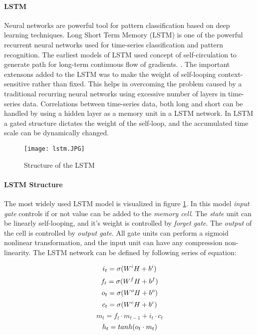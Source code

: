 \paragraph{LSTM} Neural networks are powerful tool for pattern classification based on deep learning techniques. Long Short Term Memory (LSTM) is one of the powerful recurrent neural networks used for time-series classification and pattern recognition. The earliest models of LSTM used concept of self-circulation to generate path for long-term continuous flow of gradients. \cite{long_short_hochreiter}. The important extensons added to the LSTM was to make the weight of self-looping context-sensitive rather than fixed. This helps in overcoming the problem caused by a traditional recurring neural networks using excessive number of layers in time-series data. Correlations between time-series data, both long and short can be handled by using a hidden layer as a memory unit in a LSTM network. In LSTM a gated structure dictates the weight of the self-loop, and the accumulated time scale can be dynamically changed.
\begin{figure}
    \centering
    \texttt{[image: lstm.JPG]}
    \caption{Structure of the LSTM}
    \label{fig:lstm_structure}
\end{figure}
\paragraph{LSTM Structure} The most widely used LSTM model is visualized in figure \ref{fig:lstm_structure}. In this model \textit{input gate} controls if or not value can be added to the \textit{memory cell}. The \textit{state} unit can be linearly self-looping, and it's weight is controlled by \textit{forget gate}. The \textit{output} of the cell is controlled by \textit{output gate}. All gate units can perform a sigmoid nonlinear transformation, and the input unit can have any compression non-linearity. The LSTM network can be defined by following series of equation:

\begin{equation}
\label{eq:lstm_1}
    i_{t} = \sigma \small(W^iH + b^i)
\end{equation}
\begin{equation}
\label{eq:lstm_2}
    f_{t} = \sigma \small(W^fH + b^f)
\end{equation}
\begin{equation}
\label{eq:lstm_3}
    o_{t} = \sigma \small(W^oH + b^o)
\end{equation}
\begin{equation}
\label{eq:lstm_4}
    c_{t} = \sigma \small(W^cH + b^c)
\end{equation}
\begin{equation}
\label{eq:lstm_5}
    m_{t} = f_{t}\cdot m_{t-1} + i_{t}\cdot c_{t}
\end{equation}
\begin{equation}
\label{eq:lstm_6}
    h_{t} = tanh\small(o_{t}\cdot m_{t})
\end{equation}


